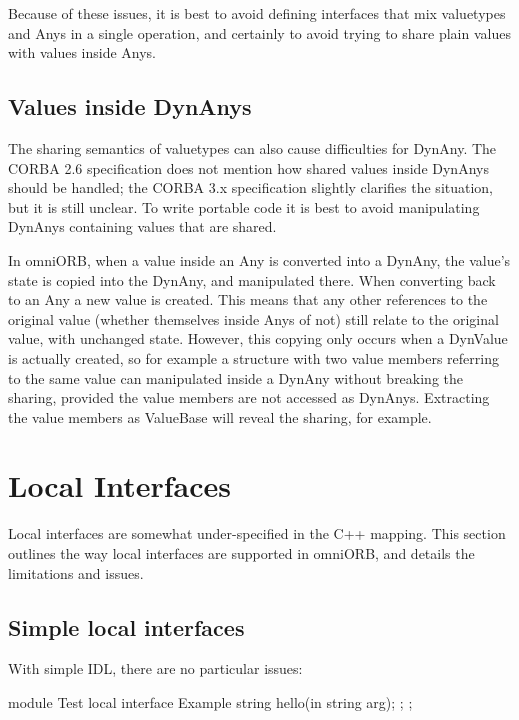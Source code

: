 \documentclass[11pt,oneside,a4paper]{book}
\begin{document}
Because of these issues, it is best to avoid defining interfaces that
mix valuetypes and Anys in a single operation, and certainly to avoid
trying to share plain values with values inside Anys.


\subsection{Values inside DynAnys}

The sharing semantics of valuetypes can also cause difficulties for
DynAny. The CORBA 2.6 specification does not mention how shared values
inside DynAnys should be handled; the CORBA 3.x specification slightly
clarifies the situation, but it is still unclear. To write portable
code it is best to avoid manipulating DynAnys containing values that
are shared.

In omniORB, when a value inside an Any is converted into a DynAny, the
value's state is copied into the DynAny, and manipulated there. When
converting back to an Any a new value is created. This means that any
other references to the original value (whether themselves inside Anys
of not) still relate to the original value, with unchanged state.
However, this copying only occurs when a DynValue is actually created,
so for example a structure with two value members referring to the
same value can manipulated inside a DynAny without breaking the
sharing, provided the value members are not accessed as DynAnys.
Extracting the value members as ValueBase will reveal the sharing, for
example.


\section{Local Interfaces}
\label{sec:LocalInterfaces}

Local interfaces are somewhat under-specified in the C++ mapping. This
section outlines the way local interfaces are supported in omniORB,
and details the limitations and issues.

\subsection{Simple local interfaces}

With simple IDL, there are no particular issues:

\begin{idllisting}
module Test {
  local interface Example {
    string hello(in string arg);
  };
};
\end{idllisting}
\end{document}

